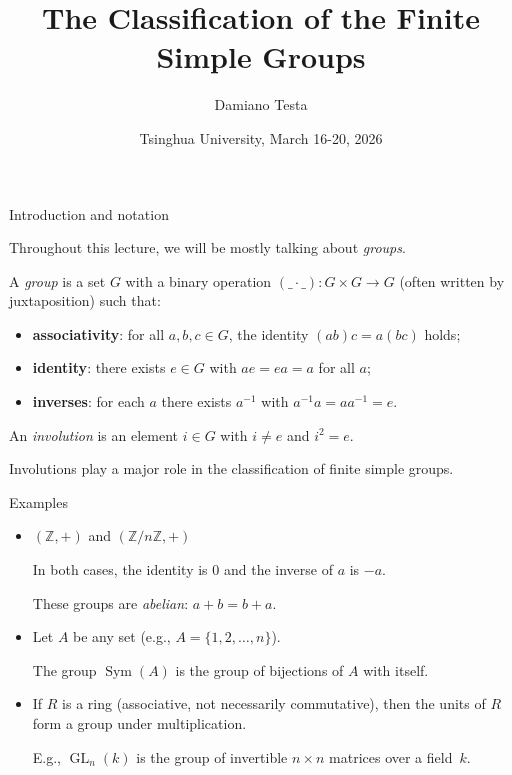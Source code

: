 \documentclass{beamer}
\title[CFSG]{The Classification of the Finite Simple Groups}
\author{Damiano Testa}
\institute[Warwick]{Mathematics Institute, University of Warwick}
\date{Tsinghua University, March 16-20, 2026}
\DeclareMathOperator{\GL}{GL}
\DeclareMathOperator{\Sym}{Sym}
\begin{document}
\frame{\titlepage}

\begin{frame}{Introduction and notation}

Throughout this lecture, we will be mostly talking about \emph{groups}.

\bigskip

A \emph{group} is a set $G$ with a binary operation $(\_ \cdot \_)\colon G\times G\to G$ (often written by juxtaposition) such that:
\begin{itemize}
  \item \textbf{associativity}: for all $a,b,c\in G$, the identity $(ab)c=a(bc)$ holds;
  \item \textbf{identity}: there exists $e\in G$ with $ae=ea=a$ for all $a$;
  \item \textbf{inverses}: for each $a$ there exists $a^{-1}$ with $a^{-1}a=aa^{-1}=e$.
\end{itemize}

\bigskip

An \emph{involution} is an element $i \in G$ with $i \neq e$ and $i^2=e$.

\smallskip

Involutions play a major role in the classification of finite simple groups.

\end{frame}

\begin{frame}{Examples}

\begin{itemize}
  \item
  $(\mathbb{Z}, +)$ and $(\mathbb{Z} / n \mathbb{Z}, +)$

  In both cases, the identity is $0$ and the inverse of $a$ is $-a$.

  \medskip

  These groups are \emph{abelian}: $a+b=b+a$.
  \medskip
  \item
  Let $A$ be any set (e.g., $A=\{1,2,\dots,n\}$).

  \medskip

  The group $\Sym(A)$ is the group of bijections of $A$ with itself.

  \medskip
  \item
  If $R$ is a ring (associative, not necessarily commutative), then the units of $R$ form a group under multiplication.

  \medskip

  E.g., $\GL_n(k)$ is the group of invertible $n \times n$ matrices over a field~$k$.
\end{itemize}

\end{frame}
\end{document}
